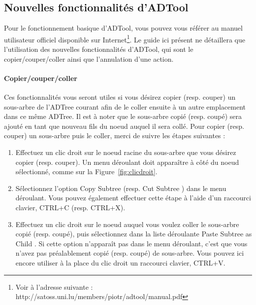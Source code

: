 \subsection{Nouvelles fonctionnalités d'ADTool}
\label{ssec:manuelADTool}

Pour le fonctionnement basique d'ADTool, vous pouvez vous référer au manuel utilisateur officiel disponible sur Internet\footnote{Voir à l'adresse suivante : http://satoss.uni.lu/members/piotr/adtool/manual.pdf}. Le guide ici présent ne détaillera que l'utilisation des nouvelles fonctionnalités d'ADTool, qui sont le copier/couper/coller ainsi que l'annulation d'une action.

\paragraph{Copier/couper/coller} Ces fonctionnalités vous seront utiles si vous désirez copier (resp. couper) un sous-arbre de l'ADTree courant afin de le coller ensuite à un autre emplacement dans ce même ADTree. Il est à noter que le sous-arbre copié (resp. coupé) sera ajouté en tant que nouveau fils du noeud auquel il sera collé. Pour copier (resp. couper) un sous-arbre puis le coller, merci de suivre les étapes suivantes : 
\begin{enumerate}
	\item Effectuez un clic droit sur le noeud racine du sous-arbre que vous désirez copier (resp. couper). Un menu déroulant doit apparaître à côté du noeud sélectionné, comme sur la {\sc Figure}~\ref{fig:clicdroit}.
	\item Sélectionnez l'option \og Copy Subtree \fg{} (resp. \og Cut Subtree \fg{}) dans le menu déroulant. Vous pouvez également effectuer cette étape à l'aide d'un raccourci clavier, {\sc CTRL+C} (resp. {\sc CTRL+X}).
	\item Effectuez un clic droit sur le noeud auquel vous voulez coller le sous-arbre copié (resp. coupé), puis sélectionnez dans la liste déroulante \og Paste Subtree as Child \fg{}. Si cette option n'apparaît pas dans le menu déroulant, c'est que vous n'avez pas préalablement copié (resp. coupé) de sous-arbre. Vous pouvez ici encore utiliser à la place du clic droit un raccourci clavier, {\sc CTRL+V}.
\end{enumerate}

